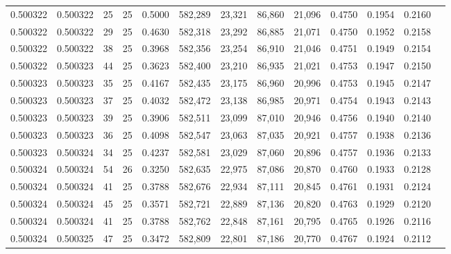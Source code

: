 \begin{tabular}{rrrrrrrrrrrrr}
0.500322 & 0.500322 &    25 &  25 &                                     0.5000 & 582,289 &  23,321 &  86,860 &  21,096 & 0.4750 & 0.1954 & 0.2160 \\
0.500322 & 0.500322 &    29 &  25 &                                     0.4630 & 582,318 &  23,292 &  86,885 &  21,071 & 0.4750 & 0.1952 & 0.2158 \\
0.500322 & 0.500322 &    38 &  25 &                                     0.3968 & 582,356 &  23,254 &  86,910 &  21,046 & 0.4751 & 0.1949 & 0.2154 \\
0.500322 & 0.500323 &    44 &  25 &                                     0.3623 & 582,400 &  23,210 &  86,935 &  21,021 & 0.4753 & 0.1947 & 0.2150 \\
0.500323 & 0.500323 &    35 &  25 &                                     0.4167 & 582,435 &  23,175 &  86,960 &  20,996 & 0.4753 & 0.1945 & 0.2147 \\
0.500323 & 0.500323 &    37 &  25 &                                     0.4032 & 582,472 &  23,138 &  86,985 &  20,971 & 0.4754 & 0.1943 & 0.2143 \\
0.500323 & 0.500323 &    39 &  25 &                                     0.3906 & 582,511 &  23,099 &  87,010 &  20,946 & 0.4756 & 0.1940 & 0.2140 \\
0.500323 & 0.500323 &    36 &  25 &                                     0.4098 & 582,547 &  23,063 &  87,035 &  20,921 & 0.4757 & 0.1938 & 0.2136 \\
0.500323 & 0.500324 &    34 &  25 &                                     0.4237 & 582,581 &  23,029 &  87,060 &  20,896 & 0.4757 & 0.1936 & 0.2133 \\
0.500324 & 0.500324 &    54 &  26 &                                     0.3250 & 582,635 &  22,975 &  87,086 &  20,870 & 0.4760 & 0.1933 & 0.2128 \\
0.500324 & 0.500324 &    41 &  25 &                                     0.3788 & 582,676 &  22,934 &  87,111 &  20,845 & 0.4761 & 0.1931 & 0.2124 \\
0.500324 & 0.500324 &    45 &  25 &                                     0.3571 & 582,721 &  22,889 &  87,136 &  20,820 & 0.4763 & 0.1929 & 0.2120 \\
0.500324 & 0.500324 &    41 &  25 &                                     0.3788 & 582,762 &  22,848 &  87,161 &  20,795 & 0.4765 & 0.1926 & 0.2116 \\
0.500324 & 0.500325 &    47 &  25 &                                     0.3472 & 582,809 &  22,801 &  87,186 &  20,770 & 0.4767 & 0.1924 & 0.2112 \\

\end{tabular}
